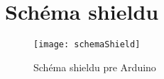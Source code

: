 
\chapter{Schéma shieldu}
\begin{figure}[hb]
\texttt{[image: schemaShield]}
\caption{Schéma shieldu pre Arduino}
\label{fig:schemaShield} 
\end{figure}


